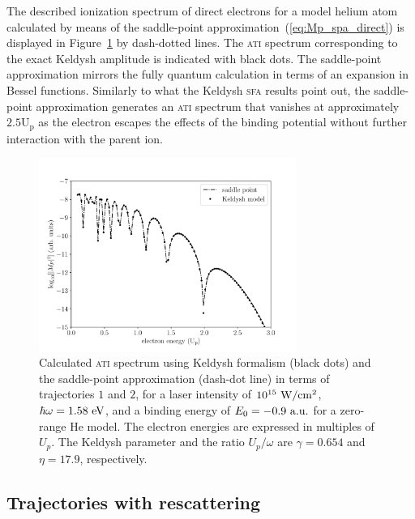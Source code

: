 The described ionization spectrum of direct electrons for a model
helium atom calculated by means of the saddle-point
approximation~(\ref{eq:Mp_spa_direct}) is displayed in
Figure~\ref{fig:ati_direct} by dash-dotted lines. The \textsc{ati}
spectrum corresponding to the exact Keldysh amplitude is indicated
with black dots. The saddle-point approximation mirrors the fully
quantum calculation in terms of an expansion in Bessel
functions. Similarly to what the Keldysh \textsc{sfa} results point
out, the saddle-point approximation generates an \textsc{ati} spectrum
that vanishes at approximately $2.5 \mathrm{U_{p}}$ as the electron
escapes the effects of the binding potential without further
interaction with the parent ion.

\begin{figure}
  \centering
  \includegraphics[width = 0.75\textwidth]{figures/ch_ATI_SPA/direct/SPvsKeldysh_spa_discrete}
  \caption{Calculated \textsc{ati} spectrum using Keldysh formalism
    (black dots) and the saddle-point approximation (dash-dot line) in
    terms of trajectories $1$ and $2$, for a laser intensity of
    $10^{15}\ \rm{W/cm^{2}}$, $\hbar\omega = 1.58\ \rm{eV}$, and a
    binding energy of $E_{0} = -0.9\ \rm{a.u.}$ for a zero-range He
    model. The electron energies are expressed in multiples of
    $U_{p}$. The Keldysh parameter and the ratio $U_{p}/\omega$ are
    $\gamma = 0.654$ and $\eta = 17.9$, respectively.}
  \label{fig:ati_direct}
\end{figure}


\subsection{\label{sec:spa_resc} Trajectories with rescattering}

